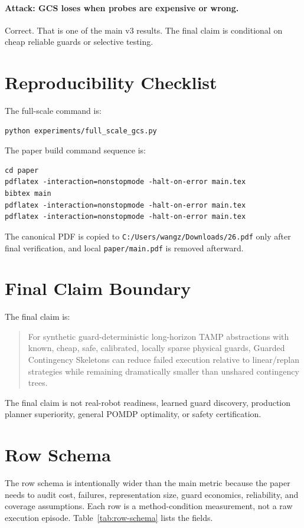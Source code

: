 \documentclass{article}
\begin{document}
\paragraph{Attack: GCS loses when probes are expensive or wrong.}
Correct. That is one of the main v3 results. The final claim is conditional on cheap reliable guards or selective testing.

\section{Reproducibility Checklist}
The full-scale command is:
\begin{verbatim}
python experiments/full_scale_gcs.py
\end{verbatim}
The paper build command sequence is:
\begin{verbatim}
cd paper
pdflatex -interaction=nonstopmode -halt-on-error main.tex
bibtex main
pdflatex -interaction=nonstopmode -halt-on-error main.tex
pdflatex -interaction=nonstopmode -halt-on-error main.tex
\end{verbatim}
The canonical PDF is copied to \texttt{C:/Users/wangz/Downloads/26.pdf} only after final verification, and local \texttt{paper/main.pdf} is removed afterward.

\section{Final Claim Boundary}
The final claim is:
\begin{quote}
For synthetic guard-deterministic long-horizon TAMP abstractions with known, cheap, safe, calibrated, locally sparse physical guards, Guarded Contingency Skeletons can reduce failed execution relative to linear/replan strategies while remaining dramatically smaller than unshared contingency trees.
\end{quote}
The final claim is not real-robot readiness, learned guard discovery, production planner superiority, general POMDP optimality, or safety certification.

\section{Row Schema}
The row schema is intentionally wider than the main metric because the paper needs to audit cost, failures, representation size, guard economics, reliability, and coverage assumptions. Each row is a method-condition measurement, not a raw execution episode. Table~\ref{tab:row-schema} lists the fields.
\end{document}
